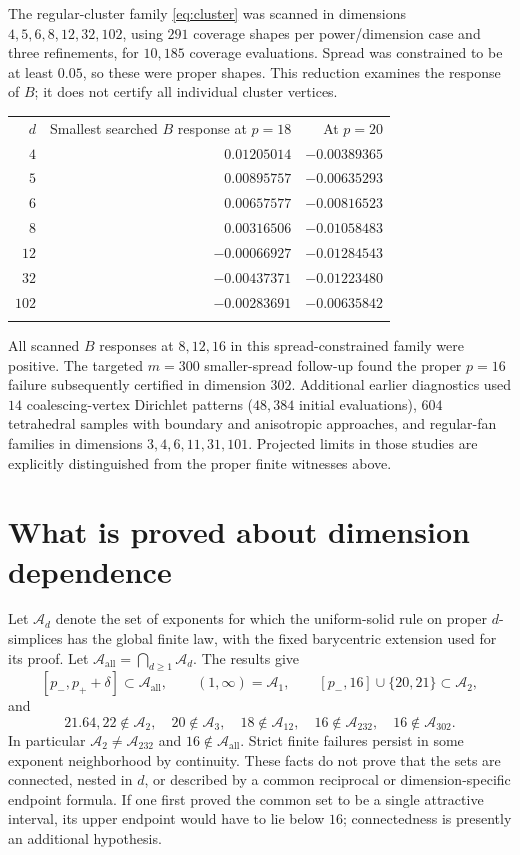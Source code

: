 \documentclass[11pt]{article}
\theoremstyle{definition}
\newcommand{\pn}{p_{-}}
\newcommand{\pp}{p_{+}}
\newcommand{\toprule}{\noalign{\hrule height 0.8pt\vskip4pt}}
\newcommand{\midrule}{\noalign{\vskip3pt\hrule height 0.4pt\vskip3pt}}
\newcommand{\bottomrule}{\noalign{\vskip3pt\hrule height 0.8pt}}
\begin{document}
The regular-cluster family \eqref{eq:cluster} was scanned in dimensions
$4,5,6,8,12,32,102$, using $291$ coverage shapes per power/dimension
case and three refinements, for $10{,}185$ coverage evaluations.
Spread was constrained to be at least $0.05$, so these were proper
shapes. This reduction examines the response of $B$; it does not certify
all individual cluster vertices.
\begin{center}
\begin{tabular}{@{}rrr@{}}
\toprule
$d$ & Smallest searched $B$ response at $p=18$ & At $p=20$\\
\midrule
$4$ & $0.01205014$ & $-0.00389365$\\
$5$ & $0.00895757$ & $-0.00635293$\\
$6$ & $0.00657577$ & $-0.00816523$\\
$8$ & $0.00316506$ & $-0.01058483$\\
$12$ & $-0.00066927$ & $-0.01284543$\\
$32$ & $-0.00437371$ & $-0.01223480$\\
$102$ & $-0.00283691$ & $-0.00635842$\\
\bottomrule
\end{tabular}
\end{center}
All scanned $B$ responses at $8,12,16$ in this spread-constrained family
were positive. The targeted $m=300$ smaller-spread follow-up found the
proper $p=16$ failure subsequently certified in dimension $302$.
Additional earlier diagnostics used $14$ coalescing-vertex Dirichlet
patterns ($48{,}384$ initial evaluations), $604$ tetrahedral samples with
boundary and anisotropic approaches, and regular-fan families in
dimensions $3,4,6,11,31,101$. Projected limits in those studies are
explicitly distinguished from the proper finite witnesses above.

\section{What is proved about dimension dependence}
Let $\mathcal A_d$ denote the set of exponents for which the uniform-solid
rule on proper $d$-simplices has the global finite law, with the fixed
barycentric extension used for its proof. Let
$\mathcal A_{\mathrm{all}}=\bigcap_{d\ge1}\mathcal A_d$.
The results give
\[
 [\pn,\pp+\delta]\subset\mathcal A_{\mathrm{all}},\qquad
 (1,\infty)=\mathcal A_1,\qquad [\pn,16]\cup\{20,21\}\subset\mathcal A_2,
\]
and
\[
 21.64,22\notin\mathcal A_2,\quad 20\notin\mathcal A_3,\quad
 18\notin\mathcal A_{12},\quad16\notin\mathcal A_{232},\quad16\notin\mathcal A_{302}.
\]
In particular $\mathcal A_2\ne\mathcal A_{232}$ and
$16\notin\mathcal A_{\mathrm{all}}$. Strict finite failures persist in
some exponent neighborhood by continuity. These facts do not prove that
the sets are connected, nested in $d$, or described by a common reciprocal
or dimension-specific endpoint formula. If one first proved the common
set to be a single attractive interval, its upper endpoint would have to
lie below $16$; connectedness is presently an additional hypothesis.
\end{document}
